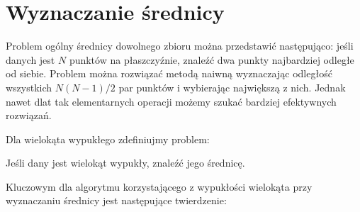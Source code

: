 \chapter{Wyznaczanie średnicy}

Problem ogólny średnicy dowolnego zbioru można przedstawić
następująco: jeśli danych jest $N$ punktów na płaszczyźnie, znaleźć
dwa punkty najbardziej odległe od siebie. Problem można rozwiązać
metodą naiwną wyznaczając odległość wszystkich $N(N-1)/2$ par punktów
i wybierając największą z nich. Jednak nawet dlat tak elementarnych
operacji możemy szukać bardziej efektywnych rozwiązań.





Dla wielokąta wypukłego zdefiniujmy problem:

\begin{problem}
  Jeśli dany jest wielokąt wypukły, znaleźć jego średnicę.
\end{problem}

Kluczowym dla algorytmu korzystającego z wypukłości wielokąta przy
wyznaczaniu średnicy jest następujące twierdzenie:


